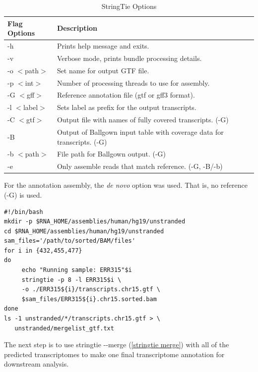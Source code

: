 \begin{longtabu} {X[.75,l]X[4.5,l]}
  \caption{StringTie Options}\\
  \toprule
  Flag Options  & Description\\
  \midrule
  \endhead
  -h            & Prints help message and exits.\\
  -v            & Verbose mode, prints bundle processing details.\\
  -o $<$path$>$ & Set name for output GTF file.\\
  -p $<$int$>$  & Number of processing threads to use for assembly.\\
  -G $<$gff$>$  & Reference annotation file (gtf or gff3 format).\\
  -l $<$label$>$& Sets label as prefix for the output transcripts.\\
  -C $<$gtf$>$  & Output file with names of fully covered transcripts. (-G)\\
  -B            & Output of Ballgown input table with coverage data for transcripts. (-G)\\
  -b $<$path$>$ & File path for Ballgown output. (-G)\\
  -e            & Only assemble reads that match reference. (-G, -B/-b)\\
  \bottomrule
\end{longtabu}

For the annotation assembly, the \textit{de novo} option was used. That is, no reference (-G) is used.

\begin{verbatim}
#!/bin/bash
mkdir -p $RNA_HOME/assemblies/human/hg19/unstranded
cd $RNA_HOME/assemblies/human/hg19/unstranded
sam_files='/path/to/sorted/BAM/files'
for i in {432,455,477}
do
     echo "Running sample: ERR315"$i
     stringtie -p 8 -l ERR315$i \
     -o ./ERR315${i}/transcripts.chr15.gtf \
     $sam_files/ERR315${i}.chr15.sorted.bam
done
ls -1 unstranded/*/transcripts.chr15.gtf > \
   unstranded/mergelist_gtf.txt
\end{verbatim}

The next step is to use stringtie -{}-merge (\ref{stringtie merge}) with all of the predicted transcriptomes to make one final transcriptome annotation for downstream analysis.

